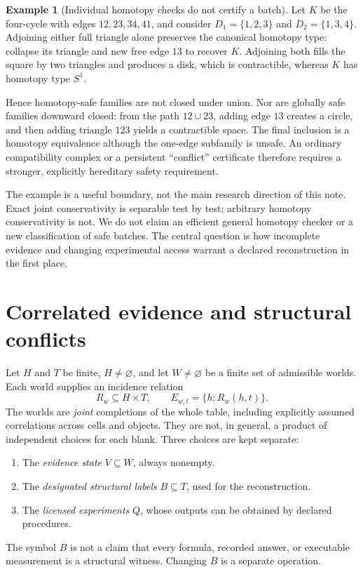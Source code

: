 \documentclass[11pt]{article}
\theoremstyle{definition}
\newtheorem{example}[theorem]{Example}
\begin{document}
\begin{example}[Individual homotopy checks do not certify a batch]
\label{ex:square-batch}
Let $K$ be the four-cycle with edges $12,23,34,41$, and consider
$D_1=\{1,2,3\}$ and $D_2=\{1,3,4\}$. Adjoining either full triangle
alone preserves the canonical homotopy type: collapse its triangle and
new free edge $13$ to recover $K$. Adjoining both fills the square by two
triangles and produces a disk, which is contractible, whereas $K$ has
homotopy type $S^1$.

Hence homotopy-safe families are not closed under union. Nor are globally
safe families downward closed: from the path $12\cup23$, adding edge
$13$ creates a circle, and then adding triangle $123$ yields a contractible
space. The final inclusion is a homotopy equivalence although the
one-edge subfamily is unsafe. An ordinary compatibility complex or a
persistent ``conflict'' certificate therefore requires a stronger,
explicitly hereditary safety requirement.
\end{example}

The example is a useful boundary, not the main research direction of this
note. Exact joint conservativity is separable test by test; arbitrary
homotopy conservativity is not. We do not claim an efficient general
homotopy checker or a new classification of safe batches. The central
question is how incomplete evidence and changing experimental access
warrant a declared reconstruction in the first place.


\section{Correlated evidence and structural conflicts}
Let $H$ and $T$ be finite, $H\ne\varnothing$, and let $W\ne\varnothing$ be a finite set of admissible worlds. Each world supplies an incidence relation
\[
 R_w\subseteq H\times T,\qquad E_{w,t}=\{h:R_w(h,t)\}.
\]
The worlds are \emph{joint} completions of the whole table, including explicitly assumed correlations across cells and objects. They are not, in general, a product of independent choices for each blank. Three choices are kept separate:
\begin{enumerate}[label=(\roman*)]
\item The \emph{evidence state} $V\subseteq W$, always nonempty.
\item The \emph{designated structural labels} $B\subseteq T$, used for the reconstruction.
\item The \emph{licensed experiments} $Q$, whose outputs can be obtained by declared procedures.
\end{enumerate}
The symbol $B$ is not a claim that every formula, recorded answer, or executable measurement is a structural witness. Changing $B$ is a separate operation.
\end{document}
